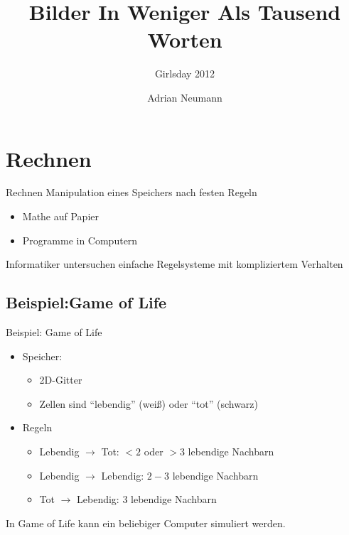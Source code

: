 \documentclass{beamer}
\title{Bilder In Weniger Als Tausend Worten}
\subtitle{Girlsday 2012}
\institute{Universit\"at des Saarlandes}
\date{}
\author[A. Neumann]{
	Adrian Neumann
}
\theoremstyle{example}
\begin{document}
\lstset{basicstyle=\ttfamily\footnotesize, numbers=left, numberstyle=\tiny, language=cf, tabsize=2}
\frame{\titlepage}

\section{Rechnen}
\begin{frame}{Rechnen}
Manipulation eines Speichers nach festen Regeln
\begin{itemize}
\item Mathe auf Papier
\item Programme in Computern
\end{itemize}
\begin{block}{}\centering
Informatiker untersuchen einfache Regelsysteme mit kompliziertem Verhalten
\end{block}
\end{frame}

\subsection{Beispiel:Game of Life}
\begin{frame}{Beispiel: Game of Life}
\begin{itemize}
\item Speicher: 
  \begin{itemize}
    \item 2D-Gitter
    \item Zellen sind ``lebendig'' (weiß) oder ``tot'' (schwarz)
  \end{itemize}
\item Regeln
  \begin{itemize}
  \item Lebendig $\rightarrow$ Tot: $<2$ oder $>3$ lebendige Nachbarn
  \item Lebendig $\rightarrow$ Lebendig: $2-3$ lebendige Nachbarn
  \item Tot $\rightarrow$ Lebendig: 3 lebendige Nachbarn
  \end{itemize}
\end{itemize}
\begin{block}{}\centering
\centering In Game of Life kann ein beliebiger Computer simuliert werden.
\end{block}
\end{frame}
\end{document}
